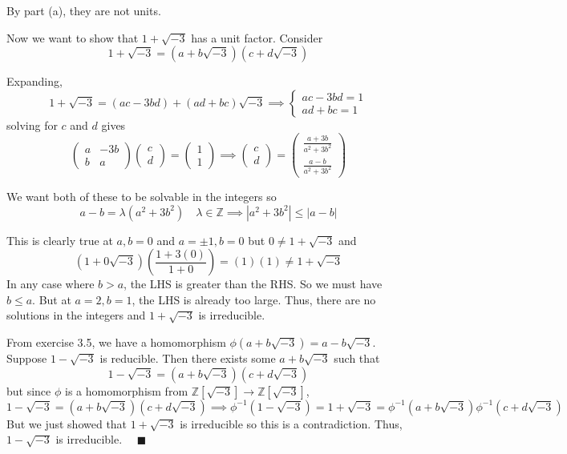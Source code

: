 \documentclass[12pt]{article}
\newcommand{\Z}{\mathbb{Z}}
\newcommand{\qed}{\quad \blacksquare}
\newcommand{\abs}[1]{\left\vert #1 \right\vert}
\begin{document}
\begin{enumerate}[(a)]
        \color{blue}
            By part (a), they are not units. 

            Now we want to show that $1 + \sqrt{-3}$ has a unit factor. Consider 
            \[1 + \sqrt{-3} = (a + b\sqrt{-3})(c + d\sqrt{-3})\]

            Expanding, 
            \[1 + \sqrt{-3} = (ac - 3bd) + (ad + bc)\sqrt{-3} \implies \begin{cases}
                ac - 3bd = 1\\
                ad + bc = 1
            \end{cases}\]
            solving for $c$ and $d$ gives
            \[\begin{pmatrix}
                a & -3b\\
                b & a
            \end{pmatrix} \begin{pmatrix}
                c\\
                d
            \end{pmatrix} = \begin{pmatrix}
                1\\
                1
            \end{pmatrix} \implies \begin{pmatrix}
                c\\
                d
            \end{pmatrix} = \begin{pmatrix}
                \frac{a + 3b}{a^2 + 3b^2}\\
                \frac{a - b}{a^2 + 3b^2}
            \end{pmatrix}\]

            We want both of these to be solvable in the integers so 
            \[a - b = \lambda(a^2 + 3b^2) \quad \lambda \in \Z \implies \abs{a^2 + 3b^2} \leq \abs{a - b}\]

            This is clearly true at $a, b = 0$ and $a = \pm 1, b = 0$ but $0 \neq 1 + \sqrt{-3}$ and
            \[(1 + 0\sqrt{-3})(\frac{1 + 3(0)}{1 + 0}) = (1)(1) \neq 1 + \sqrt{-3}\] 
            In any case where $b > a$, the LHS is greater than the RHS. So we must have $b \leq a$. But at $a = 2, b = 1$, the LHS is already too large. Thus, there are no solutions in the integers and $1 + \sqrt{-3}$ is irreducible.

            From exercise 3.5, we have a homomorphism $\phi(a + b\sqrt{-3}) = a - b\sqrt{-3}$. Suppose $1 - \sqrt{-3}$ is reducible. Then there exists some $a + b\sqrt{-3}$ such that
            \[1 - \sqrt{-3} = (a + b\sqrt{-3})(c + d\sqrt{-3})\]
            but since $\phi$ is a homomorphism from $\Z[\sqrt{-3}] \to \Z[\sqrt{-3}]$,
            \[1 - \sqrt{-3} = (a + b\sqrt{-3})(c + d\sqrt{-3}) \implies \phi^{-1}(1 - \sqrt{-3}) = 1 + \sqrt{-3} = \phi^{-1}(a + b\sqrt{-3})\phi^{-1}(c + d \sqrt{-3})\]
            But we just showed that $1 + \sqrt{-3}$ is irreducible so this is a contradiction. Thus, $1 - \sqrt{-3}$ is irreducible. $\qed$


\end{enumerate}
\end{document}
